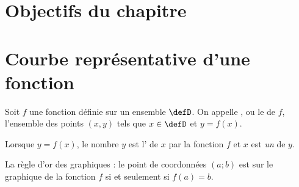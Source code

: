 
\section{Objectifs du chapitre}


\section{Courbe représentative d'une fonction}

\begin{Aprojeter}
    
\end{Aprojeter}

\begin{definition}
Soit $f$ une fonction définie sur un ensemble $\defD$.
    On appelle , ou le  de $f$, l'ensemble des points $(x,y)$ tels que $x\in\defD$ et $y=f(x)$.

    Lorsque \( y=f(x)\), le nombre \( y\) est l' de \( x\) par la fonction \( f\) et \( x\) est \emph{un}  de \( y\).
\end{definition}

\begin{Aretenir}
    La règle d'or des graphiques : le point de coordonnées \( (a;b)\) est sur le graphique de la fonction \( f\) si et seulement si \( f(a)=b\).
\end{Aretenir}

